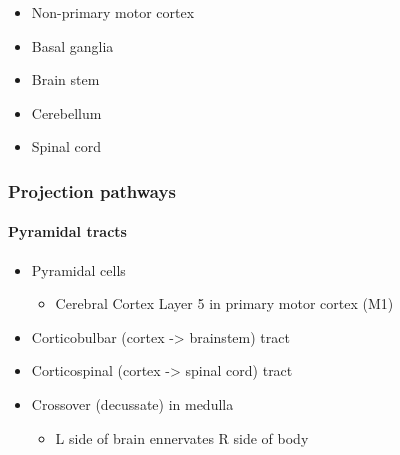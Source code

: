 \documentclass[
  letterpaper,
  DIV=11,
  numbers=noendperiod]{scrartcl}
\let\oldparagraph\paragraph
\renewcommand{\paragraph}[1]{\oldparagraph{#1}\mbox{}}
\providecommand{\tightlist}{%
  \setlength{\itemsep}{0pt}\setlength{\parskip}{0pt}}\usepackage{longtable,booktabs,array}
\begin{document}
\begin{itemize}
\tightlist
\item
  Non-primary motor cortex
\item
  Basal ganglia
\item
  Brain stem
\item
  Cerebellum
\item
  Spinal cord
\end{itemize}

\subsubsection{Projection pathways}\label{projection-pathways}

\paragraph{Pyramidal tracts}\label{pyramidal-tracts}

\begin{itemize}
\tightlist
\item
  Pyramidal cells

  \begin{itemize}
  \tightlist
  \item
    Cerebral Cortex Layer 5 in primary motor cortex (M1)
  \end{itemize}
\item
  Corticobulbar (cortex -\textgreater{} brainstem) tract
\item
  Corticospinal (cortex -\textgreater{} spinal cord) tract
\item
  Crossover (decussate) in medulla

  \begin{itemize}
  \tightlist
  \item
    L side of brain ennervates R side of body
  \end{itemize}
\end{itemize}
\end{document}
